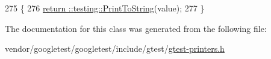 \begin{DoxyCode}
275                                                 \{
276     \hyperlink{namespacetesting_aa5717bb1144edd1d262d310ba70c82ed}{return ::testing::PrintToString}(value);
277   \}
\end{DoxyCode}


The documentation for this class was generated from the following file\+:\begin{DoxyCompactItemize}
\item 
vendor/googletest/googletest/include/gtest/\hyperlink{gtest-printers_8h}{gtest-\/printers.\+h}\end{DoxyCompactItemize}
